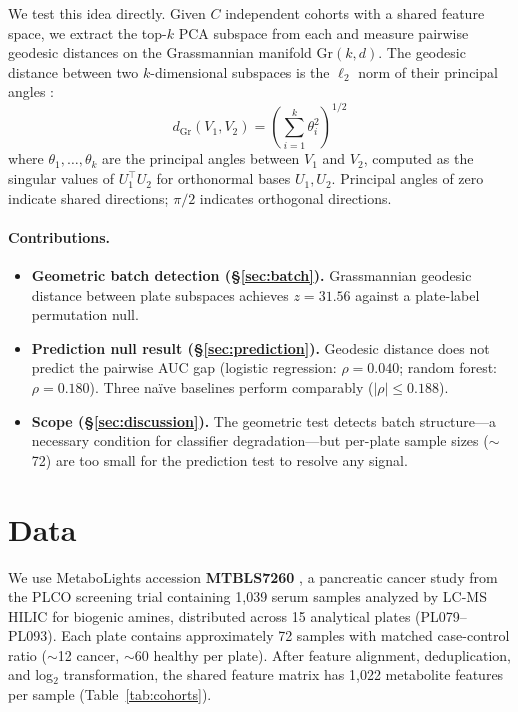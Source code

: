 \documentclass{article}
\begin{document}
We test this idea directly. Given $C$ independent cohorts with a shared feature space, we extract the top-$k$ PCA subspace from each and measure pairwise geodesic distances on the Grassmannian manifold $\mathrm{Gr}(k, d)$. The geodesic distance between two $k$-dimensional subspaces is the $\ell_2$ norm of their principal angles \citep{bjorck1973numerical, ye2016schubert}:
\begin{equation}
d_{\mathrm{Gr}}(V_1, V_2) = \left(\sum_{i=1}^{k} \theta_i^2\right)^{1/2}
\end{equation}
where $\theta_1, \ldots, \theta_k$ are the principal angles between $V_1$ and $V_2$, computed as the singular values of $U_1^\top U_2$ for orthonormal bases $U_1, U_2$. Principal angles of zero indicate shared directions; $\pi/2$ indicates orthogonal directions.

\paragraph{Contributions.}
\begin{itemize}
\item \textbf{Geometric batch detection (\S\ref{sec:batch}).} Grassmannian geodesic distance between plate subspaces achieves $z = 31.56$ against a plate-label permutation null.
\item \textbf{Prediction null result (\S\ref{sec:prediction}).} Geodesic distance does not predict the pairwise AUC gap (logistic regression: $\rho = 0.040$; random forest: $\rho = 0.180$). Three na\"{i}ve baselines perform comparably ($|\rho| \leq 0.188$).
\item \textbf{Scope (\S\ref{sec:discussion}).} The geometric test detects batch structure---a necessary condition for classifier degradation---but per-plate sample sizes ($\sim$72) are too small for the prediction test to resolve any signal.
\end{itemize}


\section{Data}

We use MetaboLights accession \textbf{MTBLS7260} \citep{leonletelier2024contributions}, a pancreatic cancer study from the PLCO screening trial containing 1{,}039 serum samples analyzed by LC-MS HILIC for biogenic amines, distributed across 15 analytical plates (PL079--PL093). Each plate contains approximately 72 samples with matched case-control ratio ($\sim$12 cancer, $\sim$60 healthy per plate). After feature alignment, deduplication, and log$_2$ transformation, the shared feature matrix has 1{,}022 metabolite features per sample (Table~\ref{tab:cohorts}).
\end{document}
